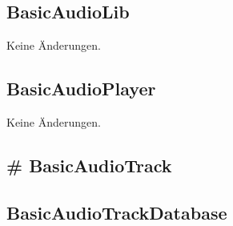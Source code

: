 \documentclass[../implementierung.tex]{subfiles}
\begin{document}
\subsection{BasicAudioLib} Keine Änderungen.

\subsection{BasicAudioPlayer} Keine Änderungen.

\subsection{\# BasicAudioTrack}
	\begin{itemize}
	\end{itemize}

\subsection{BasicAudioTrackDatabase}
\end{document}
